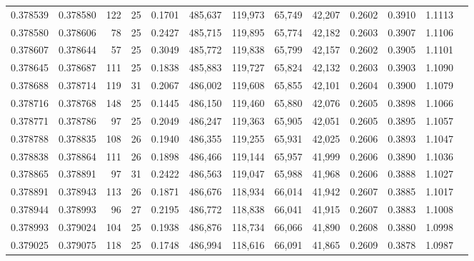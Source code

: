\begin{tabular}{rrrrrrrrrrrrr}
0.378539 & 0.378580 &   122 &  25 &                                     0.1701 & 485,637 & 119,973 &  65,749 &  42,207 & 0.2602 & 0.3910 & 1.1113 \\
0.378580 & 0.378606 &    78 &  25 &                                     0.2427 & 485,715 & 119,895 &  65,774 &  42,182 & 0.2603 & 0.3907 & 1.1106 \\
0.378607 & 0.378644 &    57 &  25 &                                     0.3049 & 485,772 & 119,838 &  65,799 &  42,157 & 0.2602 & 0.3905 & 1.1101 \\
0.378645 & 0.378687 &   111 &  25 &                                     0.1838 & 485,883 & 119,727 &  65,824 &  42,132 & 0.2603 & 0.3903 & 1.1090 \\
0.378688 & 0.378714 &   119 &  31 &                                     0.2067 & 486,002 & 119,608 &  65,855 &  42,101 & 0.2604 & 0.3900 & 1.1079 \\
0.378716 & 0.378768 &   148 &  25 &                                     0.1445 & 486,150 & 119,460 &  65,880 &  42,076 & 0.2605 & 0.3898 & 1.1066 \\
0.378771 & 0.378786 &    97 &  25 &                                     0.2049 & 486,247 & 119,363 &  65,905 &  42,051 & 0.2605 & 0.3895 & 1.1057 \\
0.378788 & 0.378835 &   108 &  26 &                                     0.1940 & 486,355 & 119,255 &  65,931 &  42,025 & 0.2606 & 0.3893 & 1.1047 \\
0.378838 & 0.378864 &   111 &  26 &                                     0.1898 & 486,466 & 119,144 &  65,957 &  41,999 & 0.2606 & 0.3890 & 1.1036 \\
0.378865 & 0.378891 &    97 &  31 &                                     0.2422 & 486,563 & 119,047 &  65,988 &  41,968 & 0.2606 & 0.3888 & 1.1027 \\
0.378891 & 0.378943 &   113 &  26 &                                     0.1871 & 486,676 & 118,934 &  66,014 &  41,942 & 0.2607 & 0.3885 & 1.1017 \\
0.378944 & 0.378993 &    96 &  27 &                                     0.2195 & 486,772 & 118,838 &  66,041 &  41,915 & 0.2607 & 0.3883 & 1.1008 \\
0.378993 & 0.379024 &   104 &  25 &                                     0.1938 & 486,876 & 118,734 &  66,066 &  41,890 & 0.2608 & 0.3880 & 1.0998 \\
0.379025 & 0.379075 &   118 &  25 &                                     0.1748 & 486,994 & 118,616 &  66,091 &  41,865 & 0.2609 & 0.3878 & 1.0987 \\

\end{tabular}
